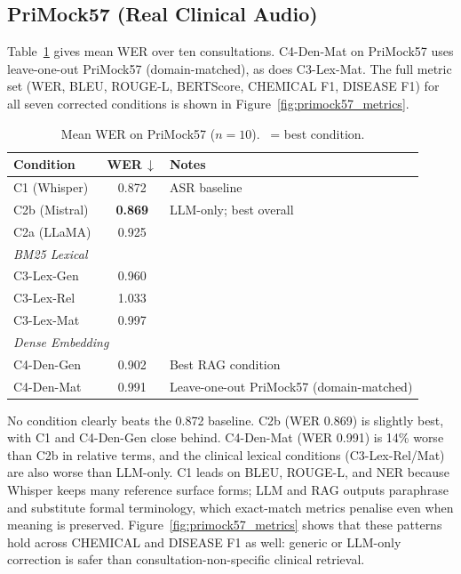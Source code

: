 \documentclass[11pt,a4paper,twocolumn]{article}
\newcommand{\dn}{\textcolor{red!70!black}{$\downarrow$}}
\newcommand{\best}{\checkmark}
\newcommand{\bestnum}[1]{\textbf{#1}}
\begin{document}
\subsection{PriMock57 (Real Clinical Audio)}
\label{sec:primock57_results}

Table~\ref{tab:primock57} gives mean WER over ten consultations.
C4-Den-Mat on PriMock57 uses leave-one-out PriMock57 (domain-matched), as does
C3-Lex-Mat.
The full metric set (WER, BLEU, ROUGE-L, BERTScore, CHEMICAL F1, DISEASE F1)
for all seven corrected conditions is shown in Figure~\ref{fig:primock57_metrics}.

\begin{table}[!t]
\centering
\caption{Mean WER on PriMock57 ($n{=}10$). \best\ = best condition.}
\label{tab:primock57}
\footnotesize
\setlength{\tabcolsep}{3.5pt}
\renewcommand{\arraystretch}{1.05}
\begin{tabular}{lcp{3.2cm}}
\toprule
\textbf{Condition} & \textbf{WER\,\dn} & \textbf{Notes} \\
\midrule
C1 (Whisper)      & 0.872 & ASR baseline \\
\midrule
C2b (Mistral)~\best & \bestnum{0.869} & LLM-only; best overall \\
C2a (LLaMA)       & 0.925 & \\
\midrule
\multicolumn{3}{l}{\small\textit{BM25 Lexical}} \\
C3-Lex-Gen        & 0.960 & \\
C3-Lex-Rel        & 1.033 & \\
C3-Lex-Mat        & 0.997 & \\
\midrule
\multicolumn{3}{l}{\small\textit{Dense Embedding}} \\
C4-Den-Gen        & 0.902 & Best RAG condition \\
C4-Den-Mat        & 0.991 & Leave-one-out PriMock57 (domain-matched) \\
\bottomrule
\end{tabular}
\end{table}

No condition clearly beats the 0.872 baseline. C2b (WER 0.869) is slightly
best, with C1 and C4-Den-Gen close behind. C4-Den-Mat (WER 0.991) is 14\%
worse than C2b in relative terms, and the clinical lexical conditions
(C3-Lex-Rel/Mat) are also worse than LLM-only. C1 leads on BLEU, ROUGE-L,
and NER because Whisper keeps many reference surface forms; LLM and RAG
outputs paraphrase and substitute formal terminology, which exact-match
metrics penalise even when meaning is preserved. Figure~\ref{fig:primock57_metrics}
shows that these patterns hold across CHEMICAL and DISEASE F1 as well: generic
or LLM-only correction is safer than consultation-non-specific clinical
retrieval.
\end{document}
